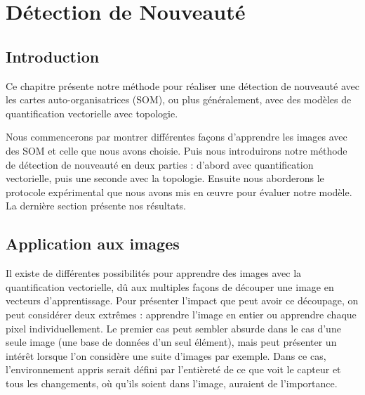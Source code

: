 
\chapter{Détection de Nouveauté}
	\minitoc
	\newpage




			
	\section{Introduction}

	Ce chapitre présente notre méthode pour réaliser une détection de nouveauté avec les cartes auto-organisatrices (SOM), ou plus généralement, avec des modèles de quantification vectorielle avec topologie.

	Nous commencerons par montrer différentes façons d'apprendre les images avec des SOM et celle que nous avons choisie. Puis nous introduirons notre méthode de détection de nouveauté en deux parties : d'abord avec quantification vectorielle, puis une seconde avec la topologie. Ensuite nous aborderons le protocole expérimental que nous avons mis en œuvre pour évaluer notre modèle. La dernière section présente nos résultats.

	\section{Application aux images}\label{sec:images}

	Il existe de différentes possibilités pour apprendre des images avec la quantification vectorielle, dû aux multiples façons de découper une image en vecteurs d'apprentissage. Pour présenter l'impact que peut avoir ce découpage, on peut considérer deux extrêmes : apprendre l'image en entier ou apprendre chaque pixel individuellement. Le premier cas peut sembler absurde dans le cas d'une seule image (une base de données d'un seul élément), mais peut présenter un intérêt lorsque l'on considère une suite d'images par exemple. Dans ce cas, l'environnement appris serait défini par l'entièreté de ce que voit le capteur et tous les changements, où qu'ils soient dans l'image, auraient de l'importance.

